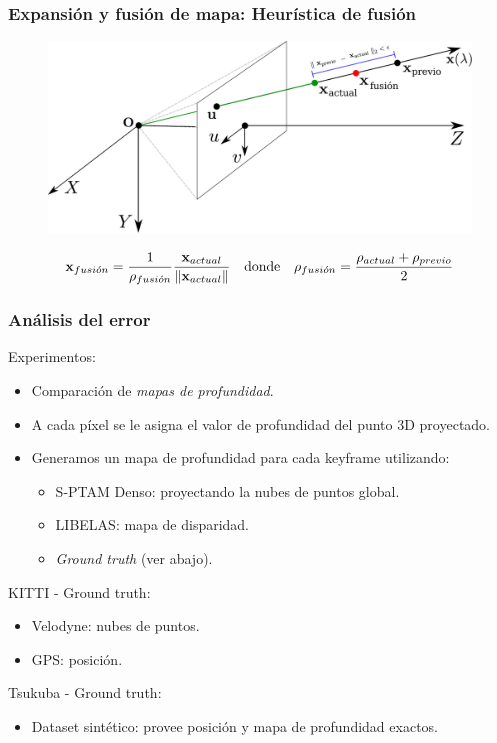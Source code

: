 \documentclass[compress]{beamer}
\begin{document}
\begin{frame}
	\frametitle{Expansión y fusión de mapa: Heurística de fusión}
	\begin{figure}[htb]
		\centering
		\includegraphics[width=\columnwidth]{method/metodo-fusion-spa.pdf}
	\end{figure}
	\begin{equation*}
		\boldsymbol{\mathbf{x}}_{fusi\acute{o}n}=\frac{1}{\rho_{fusi\acute{o}n}}\frac{\boldsymbol{\mathbf{x}}_{actual}}{\left\lVert\boldsymbol{\mathbf{x}}_{actual}\right\rVert}
		\quad \text{donde} \quad 
		\rho_{fusi\acute{o}n}=\frac{\rho_{actual}+\rho_{previo}}{2}
	\end{equation*}
\end{frame}


\begin{frame}
	\frametitle{Análisis del error}
	
	\vspace{-1em}
	Experimentos:
	\begin{itemize}
		\item Comparación de \emph{mapas de profundidad}.
		\item A cada píxel se le asigna el valor de profundidad del punto 3D proyectado.
		\item Generamos un mapa de profundidad para cada keyframe utilizando:
		\begin{itemize}
			\item S-PTAM Denso: proyectando la nubes de puntos global.
			\item LIBELAS: mapa de disparidad.
			\item \emph{Ground truth} (ver abajo).
		\end{itemize}
	\end{itemize}

	\vspace{1em}
	\pause{}	
	KITTI - Ground truth:
	\begin{itemize}
		\item Velodyne: nubes de puntos.
		\item GPS: posición.
	\end{itemize}
	
	\vspace{1em}
	Tsukuba - Ground truth:
	\begin{itemize}
		\item Dataset sintético: provee posición y mapa de profundidad exactos.
	\end{itemize}
	
\end{frame}
\end{document}
